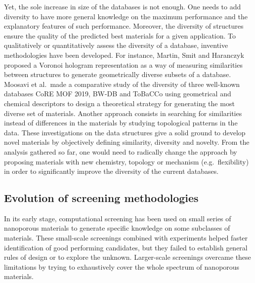 \documentclass[main.tex]{subfiles}
\begin{document}
Yet, the sole increase in size of the databases is not enough. One needs to add diversity to have more general knowledge on the maximum performance and the explanatory features of such performance. Moreover, the diversity of structures ensure the quality of the predicted best materials for a given application.
To qualitatively or quantitatively assess the diversity of a database, inventive methodologies have been developed.
For instance, Martin, Smit and Haranczyk proposed a Voronoi hologram representation as a way of measuring similarities between structures to generate geometrically diverse subsets of a database.\cite{Martin_2011}
Moosavi et al.\ made a comparative study of the diversity of three well-known databases CoRE MOF 2019,\cite{Chung_2019} BW-DB\cite{Boyd_2016} and ToBaCCo\cite{Gomez_Gualdron_2016, Colon_2017}  using geometrical and chemical descriptors to design a theoretical strategy for generating the most diverse set of materials.\cite{Moosavi_2020}
Another approach consists in searching for similarities instead of differences in the materials by studying topological patterns in the data.\cite{Lee_2017}
These investigations on the data structures give a solid ground to develop novel materials by objectively defining similarity, diversity and novelty. From the analysis gathered so far, one would need to radically change the approach by proposing materials with new chemistry, topology or mechanism (e.g.\ flexibility) in order to significantly improve the diversity of the current databases.

\subsection{Evolution of screening methodologies}

In its early stage, computational screening has been used on small series of nanoporous materials to generate specific knowledge on some subclasses of materials. These small-scale screenings combined with experiments helped faster identification of good performing candidates, but they failed to establish general rules of design or to explore the unknown. Larger-scale screenings overcame these limitations by trying to exhaustively cover the whole spectrum of nanoporous materials.
\end{document}

